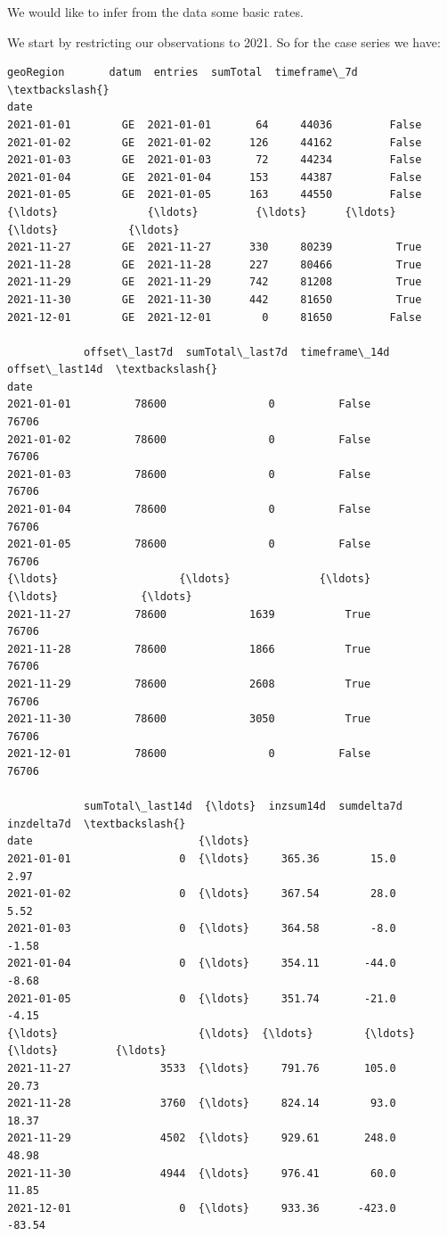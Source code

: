 \documentclass[11pt]{article}
\begin{document}
We would like to infer from the data some basic rates.

    We start by restricting our observations to 2021. So for the case series
we have:

            \begin{tcolorbox}[breakable, size=fbox, boxrule=.5pt, pad at break*=1mm, opacityfill=0]
\begin{Verbatim}[commandchars=\\\{\}]
           geoRegion       datum  entries  sumTotal  timeframe\_7d  \textbackslash{}
date
2021-01-01        GE  2021-01-01       64     44036         False
2021-01-02        GE  2021-01-02      126     44162         False
2021-01-03        GE  2021-01-03       72     44234         False
2021-01-04        GE  2021-01-04      153     44387         False
2021-01-05        GE  2021-01-05      163     44550         False
{\ldots}              {\ldots}         {\ldots}      {\ldots}       {\ldots}           {\ldots}
2021-11-27        GE  2021-11-27      330     80239          True
2021-11-28        GE  2021-11-28      227     80466          True
2021-11-29        GE  2021-11-29      742     81208          True
2021-11-30        GE  2021-11-30      442     81650          True
2021-12-01        GE  2021-12-01        0     81650         False

            offset\_last7d  sumTotal\_last7d  timeframe\_14d  offset\_last14d  \textbackslash{}
date
2021-01-01          78600                0          False           76706
2021-01-02          78600                0          False           76706
2021-01-03          78600                0          False           76706
2021-01-04          78600                0          False           76706
2021-01-05          78600                0          False           76706
{\ldots}                   {\ldots}              {\ldots}            {\ldots}             {\ldots}
2021-11-27          78600             1639           True           76706
2021-11-28          78600             1866           True           76706
2021-11-29          78600             2608           True           76706
2021-11-30          78600             3050           True           76706
2021-12-01          78600                0          False           76706

            sumTotal\_last14d  {\ldots}  inzsum14d  sumdelta7d  inzdelta7d  \textbackslash{}
date                          {\ldots}
2021-01-01                 0  {\ldots}     365.36        15.0        2.97
2021-01-02                 0  {\ldots}     367.54        28.0        5.52
2021-01-03                 0  {\ldots}     364.58        -8.0       -1.58
2021-01-04                 0  {\ldots}     354.11       -44.0       -8.68
2021-01-05                 0  {\ldots}     351.74       -21.0       -4.15
{\ldots}                      {\ldots}  {\ldots}        {\ldots}         {\ldots}         {\ldots}
2021-11-27              3533  {\ldots}     791.76       105.0       20.73
2021-11-28              3760  {\ldots}     824.14        93.0       18.37
2021-11-29              4502  {\ldots}     929.61       248.0       48.98
2021-11-30              4944  {\ldots}     976.41        60.0       11.85
2021-12-01                 0  {\ldots}     933.36      -423.0      -83.54


\end{Verbatim}
\end{tcolorbox}
\end{document}
